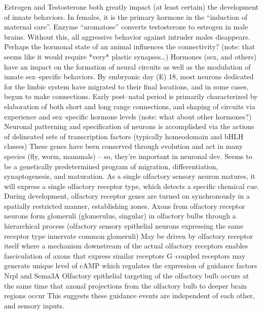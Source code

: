 \documentclass[11pt, a4paper, oneside]{article}   	%
\begin{document}
\begin{outline}
  \point Estrogen and Testosterone both greatly impact (at least certain) the development of innate behaviors. In females, it is the primary hormone in the ``induction of maternal care''.
    \subpoint Enzyme ``aromatose'' converts testosterone to estrogen in male brains. Without this, all aggressive behavior against intruder males disappears.
        \subsubpoint Perhaps the hormonal state of an animal influences the connectivity? (note: that seems like it would require *very* plastic synapses\ldots)
  \point Hormones (sex, and others) have an impact on the formation of neural circuits as well as the modulation of innate sex--specific behaviors.
  \point By embryonic day (E) 18, most neurons dedicated for the limbic system have migrated to their final locations, and in some cases, begun to make connections.
    \subpoint Early post--natal period is primarily characterized by elaboration of both short and long range connections, and shaping of circuits via experience and sex--specific hormone levels (note: what about other hormones?)
    \point Neuronal patterning and specification of neurons is accomplished via the actions of delineated sets of transcription factors (typically homeodomain and bHLH classes)
        \subpoint These genes have been conserved through evolution and act in many species (fly, worm, mammals) -- so, they're important in neuronal dev.
  \point Seems to be a genetically predetermined program of migration, differentiation, synaptogenesis, and maturation.
  \point As a single olfactory sensory neuron matures, it will express a single olfactory receptor type, which detects a specific chemical cue.
    \subpoint During development, olfactory receptor genes are turned on synchronously in a spatially restricted manner, establishing zones.
  \point Axons from olfactory receptor neurons form glomeruli (glomerulus, singular) in olfactory bulbs through a hierarchical process (olfactory sensory epithelial neurons expressing the same receptor type innervate common glomeruli)
    \subpoint May be driven by olfactory receptor itself where a mechanism downstream of the actual olfactory receptors enables fasciculation of axons that express similar receptors
        \subsubpoint G--coupled receptors may generate  unique level of cAMP which regulates the expression of guidance factors Nrpl and Sema3A
  \point Olfactory epithelial targeting of the olfactory bulb occurs at the same time that axonal projections from the olfactory bulb to deeper brain regions occur
    \subpoint This suggests these guidance events are independent of each other, and sensory inputs.

\end{outline}
\end{document}
